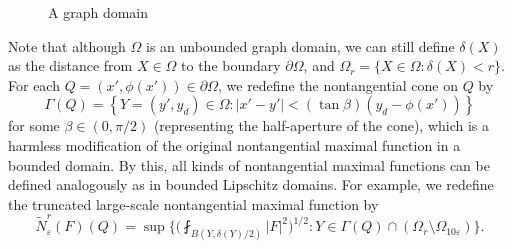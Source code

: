 \documentclass[reqno,12pt]{amsart} %
\theoremstyle{definition}
\theoremstyle{remark}
\numberwithin{equation}{section}
\newcommand{\e}{\varepsilon}
\begin{document}
    \begin{figure}[htbp]
\caption{A graph domain}
\label{fig.graphdomain}
\end{figure}

Note that although $\Omega$ is an unbounded graph domain, we can still define $\delta(X)$ as the distance from $X\in \Omega$ to the boundary $\partial \Omega$, and $\Omega_r = \{ X\in \Omega: \delta(X) < r \}$. For each $Q = (x',\phi(x')) \in \partial \Omega$, we redefine the nontangential cone on $Q$ by
\begin{equation}\label{def.Gamma.graph}
    \Gamma(Q) = \left\{Y = (y', y_d) \in \Omega: |x'-y'| < (\tan \beta) (y_d - \phi(x')) \right\}
\end{equation}
for some $\beta \in (0,\pi/2)$ (representing the half-aperture of the cone), which is a harmless modification of the original nontangential maximal function in a bounded domain. By this, all kinds of nontangential maximal functions can be defined analogously as in bounded Lipschitz domains.
For example, we redefine the truncated large-scale nontangential maximal function by
\begin{equation}\label{def.tNe.truncated}
    \widetilde{N}_\e^r(F)(Q) = \sup\bigg\{ \bigg(\fint_{B(Y,\delta(Y)/2)} |F|^2 \bigg)^{1/2}: Y\in \Gamma(Q) \cap (\Omega_{r}\setminus \Omega_{10\e}) \bigg\}.
\end{equation}
\end{document}
